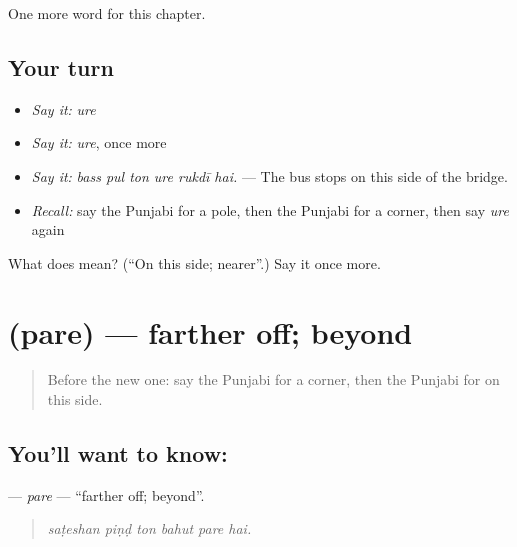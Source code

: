 \begin{grammarlens}[title={What you've built}]
One more word for this chapter.
\end{grammarlens}

\subsection*{Your turn}
\begin{itemize}
\raggedright
  \item \emph{Say it:} \emph{ure}
  \item \emph{Say it:} \emph{ure}, once more
  \item \emph{Say it:} \emph{bass pul ton ure rukdī hai.} — The bus stops on this side of the bridge.
  \item \emph{Recall:} say the Punjabi for a pole, then the Punjabi for a corner, then say \emph{ure} again
\end{itemize}

\begin{tcolorbox}[breakable,colback=teal!4,colframe=teal!35!black,title={Before you move on}]
What does  mean? (\textquotedblleft{}On this side; nearer\textquotedblright{}.) Say it once more.
\end{tcolorbox}
\section[\texorpdfstring{\pa{ਪਰੇ} (pare)}{ਪਰੇ (pare)}]{ (pare) — farther off; beyond}

\label{lesson:PA-C265-pare}



\begin{quote}
Before the new one: say the Punjabi for a corner, then the Punjabi for on this side.
\end{quote}

\subsection*{You'll want to know: }
\textbf{} — \emph{pare} — \textquotedblleft{}farther off; beyond\textquotedblright{}.

\begin{quote}
     
\end{quote}

\begin{quote}
\emph{saṭeshan piṇḍ ton bahut pare hai.}
\end{quote}

